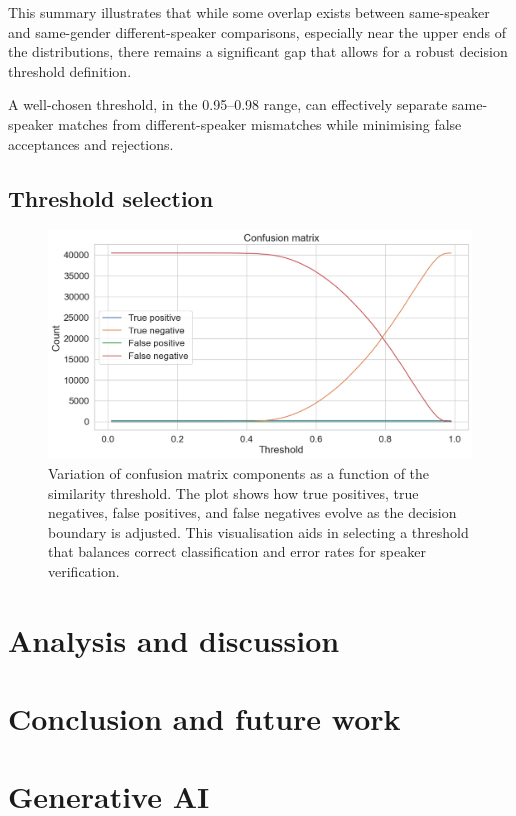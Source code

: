 \documentclass[conference]{IEEEtran}
\begin{document}
This summary illustrates that while some overlap exists between same-speaker and same-gender different-speaker comparisons, especially near the upper ends of the distributions, there remains a significant gap that allows for a robust decision threshold definition.

A well-chosen threshold, in the 0.95–0.98 range, can effectively separate same-speaker matches from different-speaker mismatches while minimising false acceptances and rejections.

\subsection{Threshold selection}


\begin{figure}[H]
	\centering
	\includegraphics[width=0.7\linewidth]{img/img-confusion-matrix}
	\caption{Variation of confusion matrix components as a function of the similarity threshold. The plot shows how true positives, true negatives, false positives, and false negatives evolve as the decision boundary is adjusted. This visualisation aids in selecting a threshold that balances correct classification and error rates for speaker verification.}
	\label{fig:img-confusion-matrix}
\end{figure}



\section{Analysis and discussion}

\section{Conclusion and future work}




\section*{Generative AI}

\printbibliography


	
\end{document}
